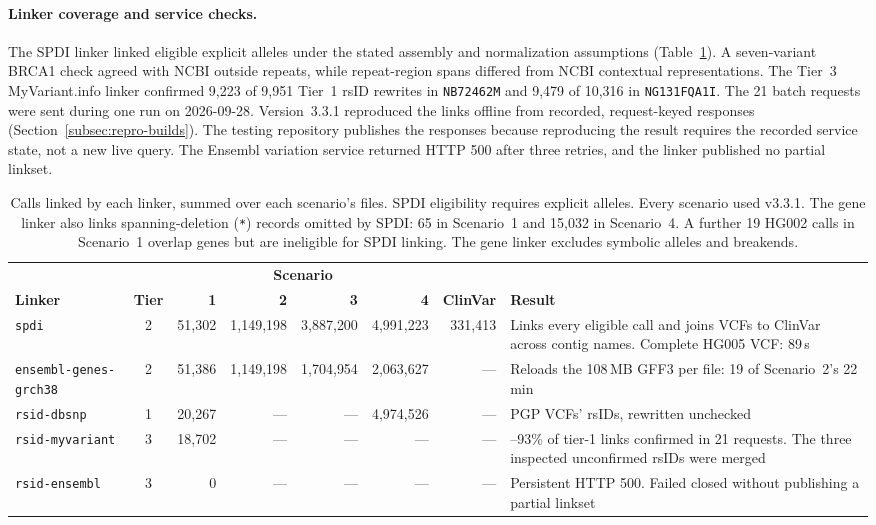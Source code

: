 \documentclass[11pt]{article}
\newcommand{\rowsep}{\noalign{\vskip2pt{\color{black!22}\hrule height 0.4pt}\vskip2pt}}%
\begin{document}
\paragraph{Linker coverage and service checks.}
The SPDI linker linked eligible explicit alleles under the stated assembly and normalization assumptions (Table~\ref{tab:usecase-links}).
A seven-variant BRCA1 check agreed with NCBI outside repeats, while repeat-region spans differed from NCBI contextual representations.
The Tier~3 MyVariant.info linker confirmed 9,223 of 9,951 Tier~1 rsID rewrites in \texttt{NB72462M} and 9,479 of 10,316 in \texttt{NG131FQA1I}.
The 21 batch requests were sent during one run on 2026-09-28.
Version~3.3.1 reproduced the links offline from recorded, request-keyed responses (Section~\ref{subsec:repro-builds}).
The testing repository publishes the responses because reproducing the result requires the recorded service state, not a new live query.
The Ensembl variation service returned HTTP 500 after three retries, and the linker published no partial linkset.

\begin{table}[!htbp]
\caption{Calls linked by each linker, summed over each scenario's files.
SPDI eligibility requires explicit alleles.
Every scenario used v3.3.1.
The gene linker also links spanning-deletion (\texttt{*}) records omitted by SPDI: 65 in Scenario~1 and 15,032 in Scenario~4.
A further 19 HG002 calls in Scenario~1 overlap genes but are ineligible for SPDI linking.
The gene linker excludes symbolic alleles and breakends.}\label{tab:usecase-links}%
\centering\footnotesize\setlength{\tabcolsep}{4pt}\renewcommand{\arraystretch}{1.1}\renewcommand{\tabularxcolumn}[1]{m{#1}}%
\setlength{\tabcolsep}{3.5pt}%
\begin{tabularx}{\textwidth}{@{}l c r r r r r >{\raggedright\arraybackslash}X@{}}
\toprule
 & & \multicolumn{4}{c}{\textbf{Scenario}} & & \\
\cmidrule(lr){3-6}
\textbf{Linker} & \textbf{Tier} & \textbf{1} & \textbf{2} & \textbf{3} & \textbf{4} & \textbf{ClinVar} & \textbf{Result}\\
\midrule
\texttt{spdi} & 2 & 51{,}302 & 1{,}149{,}198 & 3{,}887{,}200 & 4{,}991{,}223 & 331{,}413 & Links every eligible call and joins VCFs to ClinVar across contig names.
Complete HG005 VCF: 89\,s\\
\rowsep
\texttt{ensembl-genes-grch38} & 2 & 51{,}386 & 1{,}149{,}198 & 1{,}704{,}954 & 2{,}063{,}627 & --- & Reloads the 108\,MB GFF3 per file: 19 of Scenario~2's 22\,min\\
\rowsep
\texttt{rsid-dbsnp} & 1 & 20{,}267 & --- & --- & 4{,}974{,}526 & --- & PGP VCFs' rsIDs, rewritten unchecked\\
\rowsep
\texttt{rsid-myvariant} & 3 & 18{,}702 & --- & --- & --- & --- & 92--93\% of tier-1 links confirmed in 21 requests.
The three inspected unconfirmed rsIDs were merged\\
\rowsep
\texttt{rsid-ensembl} & 3 & 0 & --- & --- & --- & --- & Persistent HTTP 500.
Failed closed without publishing a partial linkset\\
\bottomrule
\end{tabularx}
\end{table}
\end{document}
